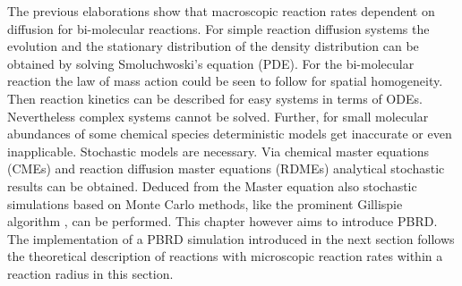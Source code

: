 \documentclass[
  a4paper,BCOR10mm,oneside,
  headsepline,footsepline,%
  fleqn,openbib
]{scrbook}
\begin{document}
The previous elaborations show that macroscopic reaction rates dependent on diffusion for bi-molecular reactions. For simple reaction diffusion systems the evolution and the stationary distribution of the density distribution can be obtained by solving Smoluchwoski's equation (PDE). For the bi-molecular reaction the law of mass action could be seen to follow for spatial homogeneity. Then reaction kinetics can be described for easy systems in terms of ODEs. Nevertheless complex systems cannot be solved. Further, for small molecular abundances of some chemical species deterministic models get inaccurate or even inapplicable. Stochastic models are necessary. Via chemical master equations (CMEs) and reaction diffusion master equations (RDMEs) analytical stochastic results can be obtained. Deduced from the Master equation also stochastic simulations based on Monte Carlo methods, like the prominent Gillispie algorithm \cite{Gillespie1977}, can be performed. This chapter however aims to introduce PBRD. The implementation of a PBRD simulation introduced in the next section follows the theoretical description of reactions with microscopic reaction rates within a reaction radius in this section.
% 
% 
% 
% 
% 
% 
% 
% 
% 
% 
% 
% 
% 
% 
% 
\end{document}
